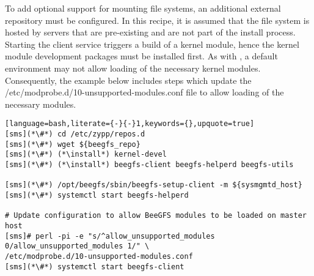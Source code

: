 To add optional support for mounting \beegfs{} file systems, an 
additional external \pkgmgr{} repository must be configured. In this recipe, it is
assumed that the \beegfs{} file system is hosted by servers that are pre-existing
and are not part of the install process. Starting the client service triggers
a build of a kernel module, hence the kernel module development packages must be
installed first. As with \Lustre{}, a default \baseOS{} environment may not allow 
loading of the necessary \beegfs{} kernel modules. Consequently, the example below 
includes steps which update the /etc/modprobe.d/10-unsupported-modules.conf file 
to allow loading of the necessary modules.

\begin{lstlisting}[language=bash,literate={-}{-}1,keywords={},upquote=true]
[sms](*\#*) cd /etc/zypp/repos.d
[sms](*\#*) wget ${beegfs_repo}
[sms](*\#*) (*\install*) kernel-devel
[sms](*\#*) (*\install*) beegfs-client beegfs-helperd beegfs-utils

[sms](*\#*) /opt/beegfs/sbin/beegfs-setup-client -m ${sysmgmtd_host}
[sms](*\#*) systemctl start beegfs-helperd

# Update configuration to allow BeeGFS modules to be loaded on master host
[sms]# perl -pi -e "s/^allow_unsupported_modules 0/allow_unsupported_modules 1/" \
/etc/modprobe.d/10-unsupported-modules.conf
[sms](*\#*) systemctl start beegfs-client
\end{lstlisting}
